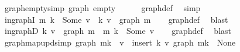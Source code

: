 \begin{isabellebody}
\isadelimdocument
%
\endisadelimdocument
{}\isamarkupfalse%
\ graph{\isacharunderscore}{\kern0pt}empty{\isacharbrackleft}{\kern0pt}simp{\isacharbrackright}{\kern0pt}{\isacharcolon}{\kern0pt}\ {\isachardoublequoteopen}graph\ empty\ {\isacharequal}{\kern0pt}\ {\isacharbraceleft}{\kern0pt}{\isacharbraceright}{\kern0pt}{\isachardoublequoteclose}\isanewline
%
\isadelimproof
\ \ %
\endisadelimproof
%
\isatagproof
{}\isamarkupfalse%
\ graph{\isacharunderscore}{\kern0pt}def\ \isamarkupfalse%
\ simp%
\endisatagproof
{\isafoldproof}%
%
\isadelimproof
\isanewline
%
\endisadelimproof
\isanewline
{}\isamarkupfalse%
\ in{\isacharunderscore}{\kern0pt}graphI{\isacharcolon}{\kern0pt}\ {\isachardoublequoteopen}m\ k\ {\isacharequal}{\kern0pt}\ Some\ v\ {\isasymLongrightarrow}\ {\isacharparenleft}{\kern0pt}k{\isacharcomma}{\kern0pt}\ v{\isacharparenright}{\kern0pt}\ {\isasymin}\ graph\ m{\isachardoublequoteclose}\isanewline
%
\isadelimproof
\ \ %
\endisadelimproof
%
\isatagproof
{}\isamarkupfalse%
\ graph{\isacharunderscore}{\kern0pt}def\ \isamarkupfalse%
\ blast%
\endisatagproof
{\isafoldproof}%
%
\isadelimproof
\isanewline
%
\endisadelimproof
\isanewline
{}\isamarkupfalse%
\ in{\isacharunderscore}{\kern0pt}graphD{\isacharcolon}{\kern0pt}\ {\isachardoublequoteopen}{\isacharparenleft}{\kern0pt}k{\isacharcomma}{\kern0pt}\ v{\isacharparenright}{\kern0pt}\ {\isasymin}\ graph\ m\ {\isasymLongrightarrow}\ m\ k\ {\isacharequal}{\kern0pt}\ Some\ v{\isachardoublequoteclose}\isanewline
%
\isadelimproof
\ \ %
\endisadelimproof
%
\isatagproof
{}\isamarkupfalse%
\ graph{\isacharunderscore}{\kern0pt}def\ \isamarkupfalse%
\ blast%
\endisatagproof
{\isafoldproof}%
%
\isadelimproof
\isanewline
%
\endisadelimproof
\isanewline
{}\isamarkupfalse%
\ graph{\isacharunderscore}{\kern0pt}map{\isacharunderscore}{\kern0pt}upd{\isacharbrackleft}{\kern0pt}simp{\isacharbrackright}{\kern0pt}{\isacharcolon}{\kern0pt}\ {\isachardoublequoteopen}graph\ {\isacharparenleft}{\kern0pt}m{\isacharparenleft}{\kern0pt}k\ {\isasymmapsto}\ v{\isacharparenright}{\kern0pt}{\isacharparenright}{\kern0pt}\ {\isacharequal}{\kern0pt}\ insert\ {\isacharparenleft}{\kern0pt}k{\isacharcomma}{\kern0pt}\ v{\isacharparenright}{\kern0pt}\ {\isacharparenleft}{\kern0pt}graph\ {\isacharparenleft}{\kern0pt}m{\isacharparenleft}{\kern0pt}k\ {\isacharcolon}{\kern0pt}{\isacharequal}{\kern0pt}\ None{\isacharparenright}{\kern0pt}{\isacharparenright}{\kern0pt}{\isacharparenright}{\kern0pt}{\isachardoublequoteclose}\isanewline

\end{isabellebody}
